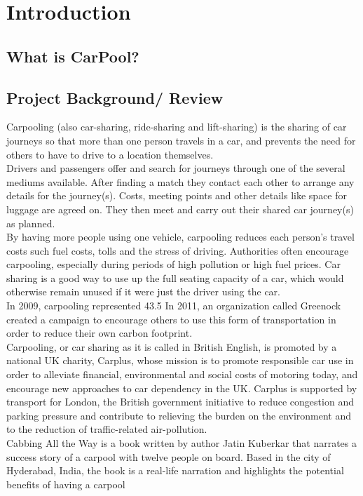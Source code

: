\chapter{Introduction} \label{chap:intro}


\section*{}
\section*{What is CarPool?}
\section{Project Background/ Review}
Carpooling (also car-sharing, ride-sharing and lift-sharing) is the sharing of car journeys so that more than one person travels in a car, and prevents the need for others to have to drive to a location themselves.
\\ Drivers and passengers offer and search for journeys through one of the several mediums available. After finding a match they contact each other to arrange any details for the journey(s). Costs, meeting points and other details like space for luggage are agreed on. They then meet and carry out their shared car journey(s) as planned.
\\ By having more people using one vehicle, carpooling reduces each person's travel costs such fuel costs, tolls and the stress of driving. Authorities often encourage carpooling, especially during periods of high pollution or high fuel prices. Car sharing is a good way to use up the full seating capacity of a car, which would otherwise remain unused if it were just the driver using the car.
\\ In 2009, carpooling represented 43.5%
In 2011, an organization called Greenock created a campaign to encourage others to use this form of transportation in order to reduce their own carbon footprint.
\\ Carpooling, or car sharing as it is called in British English, is promoted by a national UK charity, Carplus, whose mission is to promote responsible car use in order to alleviate financial, environmental and social costs of motoring today, and encourage new approaches to car dependency in the UK. Carplus is supported by transport for London, the British government initiative to reduce congestion and parking pressure and contribute to relieving the burden on the environment and to the reduction of traffic-related air-pollution.
\\ Cabbing All the Way is a book written by author Jatin Kuberkar that narrates a success story of a carpool with twelve people on board. Based in the city of Hyderabad, India, the book is a real-life narration and highlights the potential benefits of having a carpool

